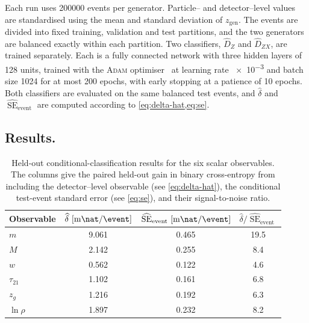 \documentclass[12pt]{article}
\newcommand{\1}{\mathbbm{1}}
\renewcommand{\[}{\begin{equation}}
\renewcommand{\]}{\end{equation}}
\begin{document}
    Each run uses \num{200000} events per generator.
    Particle-- and detector--level values are standardised using the mean and standard deviation of \(z_{\mathrm{gen}}\).
    The events are divided into fixed training, validation and test partitions, and the two generators are balanced exactly within each partition.
    Two classifiers, \(\widehat D_Z\) and \(\widehat D_{ZX}\), are trained separately.
    Each is a fully connected network with three hidden layers of \num{128} units, trained with the \textsc{Adam} optimiser~\cite{Kingma:2014} at learning rate \num{e-3} and batch size \num{1024} for at most \num{200} epochs, with early stopping at a patience of \num{10} epochs.
    Both classifiers are evaluated on the same balanced test events, and \(\widehat\delta\) and \(\widehat{\operatorname{SE}}_{\mathrm{event}}\) are computed according to \cref{eq:delta-hat,eq:se}.

    \subsection{Results.}

\begin{table}
        \centering
        \caption{
            Held-out conditional-classification results for the six scalar observables.
            The columns give the paired held-out gain in binary cross-entropy from including the detector--level observable (see \cref{eq:delta-hat}), the conditional test-event standard error (see \cref{eq:se}), and their signal-to-noise ratio.
        }
        \label{tab:scalar-results}
        \begin{tabular}{l S[table-format=1.3] S[table-format=1.3] S[table-format=2.1]}
            \toprule
            {Observable} & {\(\widehat\delta \ [\unit{\milli\nat\per\event}]\)} & {\(\widehat{\operatorname{SE}}_{\mathrm{event}} \ [\unit{\milli\nat\per\event}]\)} & {\(\widehat\delta / \widehat{\operatorname{SE}}_{\mathrm{event}}\)} \\
            \midrule
            \(m\)        & 9.061 & 0.465 & 19.5 \\
            \(M\)        & 2.142 & 0.255 &  8.4 \\
            \(w\)        & 0.562 & 0.122 &  4.6 \\
            \(\tau_{21}\) & 1.102 & 0.161 &  6.8 \\
            \(z_g\)      & 1.216 & 0.192 &  6.3 \\
            \(\ln\rho\)  & 1.897 & 0.232 &  8.2 \\
            \bottomrule
        \end{tabular}
    \end{table}
\end{document}
